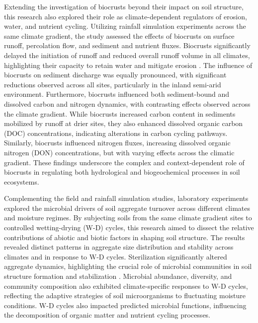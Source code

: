 Extending the investigation of biocrusts beyond their impact on soil structure, this research also explored their role as climate-dependent regulators of erosion, water, and nutrient cycling. Utilizing rainfall simulation experiments across the same climate gradient, the study assessed the effects of biocrusts on surface runoff, percolation flow, and sediment and nutrient fluxes. Biocrusts significantly delayed the initiation of runoff and reduced overall runoff volume in all climates, highlighting their capacity to retain water and mitigate erosion \citep{Kidron2022}. The influence of biocrusts on sediment discharge was equally pronounced, with significant reductions observed across all sites, particularly in the inland semi-arid environment. Furthermore, biocrusts influenced both sediment-bound and dissolved carbon and nitrogen dynamics, with contrasting effects observed across the climate gradient. While biocrusts increased carbon content in sediments mobilized by runoff at drier sites, they also enhanced dissolved organic carbon (DOC) concentrations, indicating alterations in carbon cycling pathways. Similarly, biocrusts influenced nitrogen fluxes, increasing dissolved organic nitrogen (DON) concentrations, but with varying effects across the climatic gradient. These findings underscore the complex and context-dependent role of biocrusts in regulating both hydrological and biogeochemical processes in soil ecosystems.

Complementing the field and rainfall simulation studies, laboratory experiments explored the microbial drivers of soil aggregate turnover across different climates and moisture regimes. By subjecting soils from the same climate gradient sites to controlled wetting-drying (W-D) cycles, this research aimed to dissect the relative contributions of abiotic and biotic factors in shaping soil structure. The results revealed distinct patterns in aggregate size distribution and stability across climates and in response to W-D cycles. Sterilization significantly altered aggregate dynamics, highlighting the crucial role of microbial communities in soil structure formation and stabilization \citep{Six2004}. Microbial abundance, diversity, and community composition also exhibited climate-specific responses to W-D cycles, reflecting the adaptive strategies of soil microorganisms to fluctuating moisture conditions. W-D cycles also impacted predicted microbial functions, influencing the decomposition of organic matter and nutrient cycling processes.

